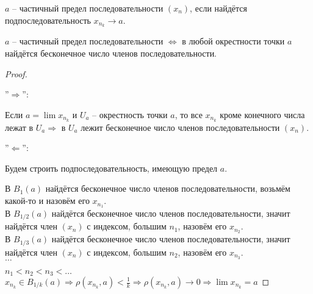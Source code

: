     \begin{conj}
    $a$ -- частичный предел последовательности $(x_n)$, если найдётся
    подпоследовательность $x_{n_k} \rightarrow a$.
    \end{conj}
    \begin{theorem-non}
    $a$ -- частичный предел последовательности $\Leftrightarrow$
    в любой окрестности точки $a$ найдётся бесконечное число членов
    последовательности.
    \end{theorem-non}
    \begin{proof} $ $
    
        ''$\Longrightarrow$'':
    
        Если $a = \lim x_{n_k}$ и $U_a$ -- окрестность точки $a$, то
        все $x_{n_k}$ кроме конечного числа лежат в $U_a \Rightarrow$
        в $U_a$ лежит бесконечное число членов последовательности $(x_n)$.
    
        ''$\Longleftarrow$'':
    
        Будем строить подпоследовательность, имеющую предел $a$.
    
        В $B_{1}(a)$ найдётся бесконечное число членов последовательности,
        возьмём какой-то и назовём его $x_{n_1}$.\\
        В $B_{1/2}(a)$ найдётся бесконечное число членов
        последовательности, значит найдётся член $(x_n)$ с индексом, большим
        $n_1$, назовём его $x_{n_2}$.\\
        В $B_{1/3}(a)$ найдётся бесконечное число членов
        последовательности, значит найдётся член $(x_n)$ с индексом, большим
        $n_2$, назовём его $x_{n_3}$.\\
        $\dots$
    
        $n_1 < n_2 < n_3 < \dots$\\
        $x_{n_k} \in B_{1/k}(a) \Rightarrow \rho(x_{n_k}, a) < \frac1k
        \Rightarrow \rho(x_{n_k}, a) \rightarrow 0 \Rightarrow
        \lim x_{n_k} = a$
    
    \end{proof}